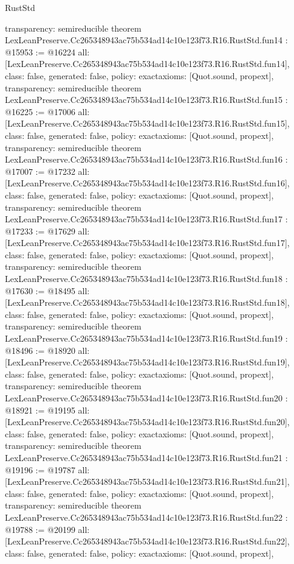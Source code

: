 \begin{lexlean}{RustStd}
\begin{coremodule}
{  transparency: semireducible
}
theorem LexLeanPreserve.Cc265348943ac75b534ad14c10e123f73.R16.RustStd.fun14 : @15953 := @16224 {
  all: [LexLeanPreserve.Cc265348943ac75b534ad14c10e123f73.R16.RustStd.fun14],
  class: false,
  generated: false,
  policy: exact{axioms: [Quot.sound, propext]},
  transparency: semireducible
}
theorem LexLeanPreserve.Cc265348943ac75b534ad14c10e123f73.R16.RustStd.fun15 : @16225 := @17006 {
  all: [LexLeanPreserve.Cc265348943ac75b534ad14c10e123f73.R16.RustStd.fun15],
  class: false,
  generated: false,
  policy: exact{axioms: [Quot.sound, propext]},
  transparency: semireducible
}
theorem LexLeanPreserve.Cc265348943ac75b534ad14c10e123f73.R16.RustStd.fun16 : @17007 := @17232 {
  all: [LexLeanPreserve.Cc265348943ac75b534ad14c10e123f73.R16.RustStd.fun16],
  class: false,
  generated: false,
  policy: exact{axioms: [Quot.sound, propext]},
  transparency: semireducible
}
theorem LexLeanPreserve.Cc265348943ac75b534ad14c10e123f73.R16.RustStd.fun17 : @17233 := @17629 {
  all: [LexLeanPreserve.Cc265348943ac75b534ad14c10e123f73.R16.RustStd.fun17],
  class: false,
  generated: false,
  policy: exact{axioms: [Quot.sound, propext]},
  transparency: semireducible
}
theorem LexLeanPreserve.Cc265348943ac75b534ad14c10e123f73.R16.RustStd.fun18 : @17630 := @18495 {
  all: [LexLeanPreserve.Cc265348943ac75b534ad14c10e123f73.R16.RustStd.fun18],
  class: false,
  generated: false,
  policy: exact{axioms: [Quot.sound, propext]},
  transparency: semireducible
}
theorem LexLeanPreserve.Cc265348943ac75b534ad14c10e123f73.R16.RustStd.fun19 : @18496 := @18920 {
  all: [LexLeanPreserve.Cc265348943ac75b534ad14c10e123f73.R16.RustStd.fun19],
  class: false,
  generated: false,
  policy: exact{axioms: [Quot.sound, propext]},
  transparency: semireducible
}
theorem LexLeanPreserve.Cc265348943ac75b534ad14c10e123f73.R16.RustStd.fun20 : @18921 := @19195 {
  all: [LexLeanPreserve.Cc265348943ac75b534ad14c10e123f73.R16.RustStd.fun20],
  class: false,
  generated: false,
  policy: exact{axioms: [Quot.sound, propext]},
  transparency: semireducible
}
theorem LexLeanPreserve.Cc265348943ac75b534ad14c10e123f73.R16.RustStd.fun21 : @19196 := @19787 {
  all: [LexLeanPreserve.Cc265348943ac75b534ad14c10e123f73.R16.RustStd.fun21],
  class: false,
  generated: false,
  policy: exact{axioms: [Quot.sound, propext]},
  transparency: semireducible
}
theorem LexLeanPreserve.Cc265348943ac75b534ad14c10e123f73.R16.RustStd.fun22 : @19788 := @20199 {
  all: [LexLeanPreserve.Cc265348943ac75b534ad14c10e123f73.R16.RustStd.fun22],
  class: false,
  generated: false,
  policy: exact{axioms: [Quot.sound, propext]},
}
\end{coremodule}
\end{lexlean}
